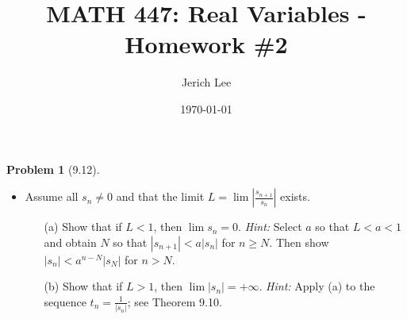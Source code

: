 \documentclass[12pt]{article}
\title{MATH 447: Real Variables - Homework \#2}
\author{Jerich Lee}
\date{\today}
\theoremstyle{definition} %
\newtheorem{problem}{Problem}
\theoremstyle{plain} %
\begin{document}
\maketitle

\begin{problem}[9.12]
    \begin{itemize}
        \item Assume all $s_n \neq 0$ and that the limit $L = \lim \left| \frac{s_{n+1}}{s_n} \right|$ exists.
        \begin{enumerate}
            \item[(a)] Show that if $L < 1$, then $\lim s_n = 0$. \textit{Hint:} Select $a$ so that $L < a < 1$ and obtain $N$ so that $|s_{n+1}| < a|s_n|$ for $n \ge N$. Then show $|s_n| < a^{n-N}|s_N|$ for $n > N$.
            \item[(b)] Show that if $L > 1$, then $\lim |s_n| = +\infty$. \textit{Hint:} Apply (a) to the sequence $t_n = \frac{1}{|s_n|}$; see Theorem 9.10.
        \end{enumerate}
    \end{itemize}
\end{problem}
\end{document}
